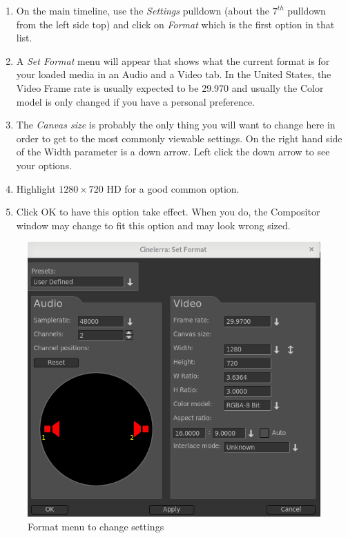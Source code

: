 \begin{enumerate}
	\item On the main timeline, use the \textit{Settings} pulldown (about the $7^{th}$ pulldown from the left side top) and
	click on \textit{Format} which is the first option in that list.
	\item A \textit{Set Format} menu will appear that shows what the current format is for your loaded media in an
	Audio and a Video tab.  In the United States, the Video Frame rate is usually expected to be 29.970	and usually the Color model is only changed if you have a personal preference.
	\item The \textit{Canvas size} is probably the only thing you will want to change here in order to get to the
	most commonly viewable settings.  On the right hand side of the Width parameter is a down arrow. 
	Left click the down arrow to see your options.
	\item Highlight $1280\times720$ HD for a good common option.
	\item Click OK to have this option take effect.  When you do, the Compositor window may change to fit
	this option and may look wrong sized.
\end{enumerate}

\begin{figure}[htpb]
	\centering
	\includegraphics[width=0.7\linewidth]{images/format_setting.png}
	\caption{Format menu to change settings}	
\end{figure}


